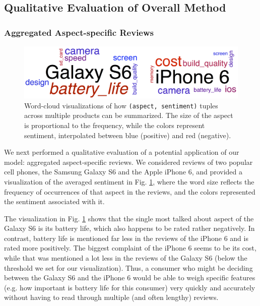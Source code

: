 \documentclass{article} %
\begin{document}
\subsection{Qualitative Evaluation of Overall Method}

\subsubsection{Aggregated Aspect-specific Reviews}
\begin{figure}[ht]
\begin{center}
\includegraphics[width=.9\columnwidth]{productCloud.png}
\end{center}
\caption{Word-cloud visualizations of how \texttt{(aspect, sentiment)} tuples across multiple products can be summarized. The size of the aspect is proportional to the frequency, while the colors represent sentiment, interpolated between blue (positive) and red (negative). }
\label{productFig}
\end{figure}

We next performed a qualitative evaluation of a potential application of our model: aggregated aspect-specific reviews. We considered reviews of two popular cell phones, the Samsung Galaxy S6 and the Apple iPhone 6, and provided a visualization of the averaged sentiment in Fig. \ref{productFig}, where the word size reflects the frequency of occurrences of that aspect in the reviews, and the colors represented the sentiment associated with it. 

The visualization in Fig. \ref{productFig} shows that the single most talked about aspect of the Galaxy S6 is its battery life, which also happens to be rated rather negatively. In contrast, battery life is mentioned far less in the reviews of the iPhone 6 and is rated more positively. The biggest complaint of the iPhone 6 seems to be its cost, while that was mentioned a lot less in the reviews of the Galaxy S6 (below the threshold we set for our visualization). Thus, a consumer who might be deciding between the Galaxy S6 and the iPhone 6 would be able to weigh specific features (e.g. how important is battery life for this consumer) very quickly and accurately without having to read through multiple (and often lengthy) reviews.
\end{document}
